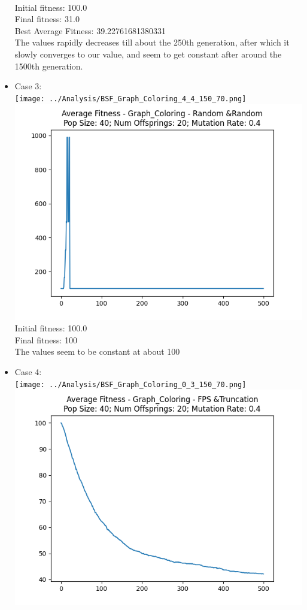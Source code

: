 \documentclass[12pt]{report} %
\begin{document}
\begin{itemize}
	      \\Initial fitness:  100.0
	      \\Final fitness:  31.0
	      \\Best Average Fitness: 39.22761681380331
	      \\The values rapidly decreases till about the 250th generation, after which it slowly converges to our value, and seem to get constant after around the 1500th generation.
	\item Case 3:\\
	      \texttt{[image: ../Analysis/BSF\_Graph\_Coloring\_4\_4\_150\_70.png]}
	      \includegraphics[scale=0.5]{../Analysis/ASF_Graph_Coloring_4_4_40_20.png}
	      \\Initial fitness:  100.0
	      \\Final fitness:  100
	      \\The values seem to be constant at about 100
	\item Case 4:\\
	      \texttt{[image: ../Analysis/BSF\_Graph\_Coloring\_0\_3\_150\_70.png]}
	      \includegraphics[scale=0.5]{../Analysis/ASF_Graph_Coloring_0_3_40_20.png}

\end{itemize}
\end{document}
